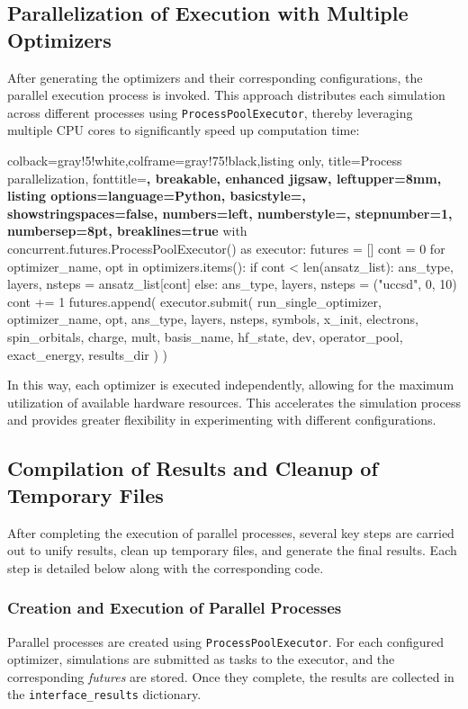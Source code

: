 \subsection{Parallelization of Execution with Multiple Optimizers}
After generating the optimizers and their corresponding configurations, the parallel execution process is invoked. This approach distributes each simulation across different processes using \texttt{ProcessPoolExecutor}, thereby leveraging multiple CPU cores to significantly speed up computation time:


\begin{tcblisting}{colback=gray!5!white,colframe=gray!75!black,listing only,
    title=Process parallelization, fonttitle=\bfseries, breakable, enhanced jigsaw, leftupper=8mm,
    listing options={language=Python, basicstyle=\ttfamily\small,
    showstringspaces=false, numbers=left, numberstyle=\footnotesize,
    stepnumber=1, numbersep=8pt, breaklines=true}}
with concurrent.futures.ProcessPoolExecutor() as executor:
    futures = []
    cont = 0
    for optimizer_name, opt in optimizers.items():
        if cont < len(ansatz_list):
            ans_type, layers, nsteps = ansatz_list[cont]
        else:
            ans_type, layers, nsteps = ("uccsd", 0, 10)
        cont += 1
        futures.append(
            executor.submit(
                run_single_optimizer,
                optimizer_name, opt, ans_type, layers, nsteps, symbols, x_init, electrons, spin_orbitals, charge,
                mult, basis_name, hf_state, dev, operator_pool, exact_energy, results_dir
            )
        )
\end{tcblisting}

In this way, each optimizer is executed independently, allowing for the maximum utilization of available hardware resources. This accelerates the simulation process and provides greater flexibility in experimenting with different configurations.

\subsection{Compilation of Results and Cleanup of Temporary Files}
After completing the execution of parallel processes, several key steps are carried out to unify results, clean up temporary files, and generate the final results. Each step is detailed below along with the corresponding code.

\subsubsection{Creation and Execution of Parallel Processes}
Parallel processes are created using \texttt{ProcessPoolExecutor}. For each configured optimizer, simulations are submitted as tasks to the executor, and the corresponding \emph{futures} are stored. Once they complete, the results are collected in the \texttt{interface\_results} dictionary.

